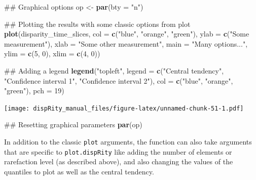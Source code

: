 \documentclass[]{book}
\newenvironment{Shaded}{\begin{snugshade}}{\end{snugshade}}
\newcommand{\KeywordTok}[1]{\textcolor[rgb]{0.13,0.29,0.53}{\textbf{#1}}}
\newcommand{\DataTypeTok}[1]{\textcolor[rgb]{0.13,0.29,0.53}{#1}}
\newcommand{\DecValTok}[1]{\textcolor[rgb]{0.00,0.00,0.81}{#1}}
\newcommand{\StringTok}[1]{\textcolor[rgb]{0.31,0.60,0.02}{#1}}
\newcommand{\NormalTok}[1]{#1}
\theoremstyle{definition}
\theoremstyle{definition}
\theoremstyle{remark}
\begin{document}
\begin{Shaded}
\begin{Highlighting}[]
\NormalTok{## Graphical options}
\NormalTok{op <-}\StringTok{ }\KeywordTok{par}\NormalTok{(}\DataTypeTok{bty =} \StringTok{"n"}\NormalTok{)}

\NormalTok{## Plotting the results with some classic options from plot}
\KeywordTok{plot}\NormalTok{(disparity_time_slices, }\DataTypeTok{col =} \KeywordTok{c}\NormalTok{(}\StringTok{"blue"}\NormalTok{, }\StringTok{"orange"}\NormalTok{, }\StringTok{"green"}\NormalTok{),}
    \DataTypeTok{ylab =} \KeywordTok{c}\NormalTok{(}\StringTok{"Some measurement"}\NormalTok{), }\DataTypeTok{xlab =} \StringTok{"Some other measurement"}\NormalTok{,}
    \DataTypeTok{main =} \StringTok{"Many options..."}\NormalTok{, }\DataTypeTok{ylim =} \KeywordTok{c}\NormalTok{(}\DecValTok{5}\NormalTok{, }\DecValTok{0}\NormalTok{), }\DataTypeTok{xlim =} \KeywordTok{c}\NormalTok{(}\DecValTok{4}\NormalTok{, }\DecValTok{0}\NormalTok{))}

\NormalTok{## Adding a legend}
\KeywordTok{legend}\NormalTok{(}\StringTok{"topleft"}\NormalTok{, }\DataTypeTok{legend =} \KeywordTok{c}\NormalTok{(}\StringTok{"Central tendency"}\NormalTok{,}
                             \StringTok{"Confidence interval 1"}\NormalTok{,}
                            \StringTok{"Confidence interval 2"}\NormalTok{),}
      \DataTypeTok{col =} \KeywordTok{c}\NormalTok{(}\StringTok{"blue"}\NormalTok{, }\StringTok{"orange"}\NormalTok{, }\StringTok{"green"}\NormalTok{), }\DataTypeTok{pch =} \DecValTok{19}\NormalTok{)}
\end{Highlighting}
\end{Shaded}

\texttt{[image: dispRity\_manual\_files/figure-latex/unnamed-chunk-51-1.pdf]}

\begin{Shaded}
\begin{Highlighting}[]
\NormalTok{## Resetting graphical parameters}
\KeywordTok{par}\NormalTok{(op)}
\end{Highlighting}
\end{Shaded}

In addition to the classic \texttt{plot} arguments, the function can
also take arguments that are specific to \texttt{plot.dispRity} like
adding the number of elements or rarefaction level (as described above),
and also changing the values of the quantiles to plot as well as the
central tendency.
\end{document}
